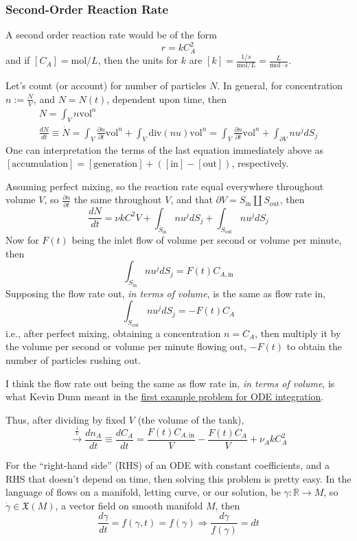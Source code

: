 \documentclass[10pt]{amsart}
\begin{document}
\begin{multicols*}{2}
\subsubsection{Second-Order Reaction Rate}

A second order reaction rate would be of the form
\[
r = kC_A^2
\]
and if $[C_A] = \text{mol}/L$, then the units for $k$ are $[k] = \frac{ 1/s}{ \text{mol}/L} = \frac{L}{ \text{mol}\cdot s}$.  


Let's count (or account) for number of particles $N$.  In general, for concentration $n:= \frac{N}{V}$, and $N=N(t)$, dependent upon time, then
\[
\begin{gathered}
  N = \int_V n \text{vol}^n  \\
  \frac{dN}{dt} \equiv \dot{N} = \int_V \frac{ \partial n}{ \partial t} \text{vol}^n + \int_V \text{div}(nu) \text{vol}^n = \int_V \frac{ \partial n}{ \partial t} \text{vol}^n + \int_{\partial V} nu^j dS_j 
\end{gathered}
\]
One can interpretation the terms of the last equation immediately above as $[\text{accumulation}] = [\text{generation}] + ([\text{in}] - [\text{out}])$, respectively.  

Assuming perfect mixing, so the reaction rate equal everywhere throughout volume $V$, so $\frac{ \partial n}{ \partial t}$ the same throughout $V$, and that $\partial V = S_{\text{in}} \coprod S_{\text{out}}$, then
\[
\frac{dN}{dt} = \nu k C^2 V + \int_{S_{\text{in}} } nu^j dS_j + \int_{S_{\text{out}}} nu^j dS_j
\]
Now for $F(t)$ being the inlet flow of volume per second or volume per minute, then
\[
\int_{S_{\text{in}}} nu^j dS_j = F(t) C_{A,\text{in}}
\]
Supposing the flow rate out, \emph{in terms of volume}, is the same as flow rate in,
\[
\int_{S_{\text{out}} } nu^j dS_j = -F(t) C_A
\]
i.e., after perfect mixing, obtaining a concentration $n=C_A$, then multiply it by the volume per second or volume per minute flowing out, $-F(t)$ to obtain the number of particles rushing out.  

I think the flow rate out being the same as flow rate in, \emph{in terms of volume}, is what Kevin Dunn meant in the \href{http://modelling3e4.connectmv.com/wiki/Software_tutorial/Integration_of_ODEs}{first example problem for ODE integration}.  

Thus, after dividing by fixed $V$ (the volume of the tank), 
\[
\xrightarrow{ \frac{1}{V} } \frac{dn_A}{dt} \equiv \frac{dC_A}{dt} = \frac{F(t)C_{A,\text{in}}}{V} - \frac{F(t)C_A}{V} + \nu_A k C_A^2 
\]

For the ``right-hand side'' (RHS) of an ODE with constant coefficients, and a RHS that doesn't depend on time, then solving this problem is pretty easy.  In the language of flows on a manifold, letting curve, or our solution, be $\gamma :\mathbb{R} \to M$, so $\dot{\gamma} \in \mathfrak{X}(M)$, a vector field on smooth manifold $M$, then
\[
\frac{d\gamma}{dt} = f(\gamma,t) = f(\gamma) \Longrightarrow \frac{d\gamma}{f(\gamma)} = dt
\]


\end{multicols*}
\end{document}

